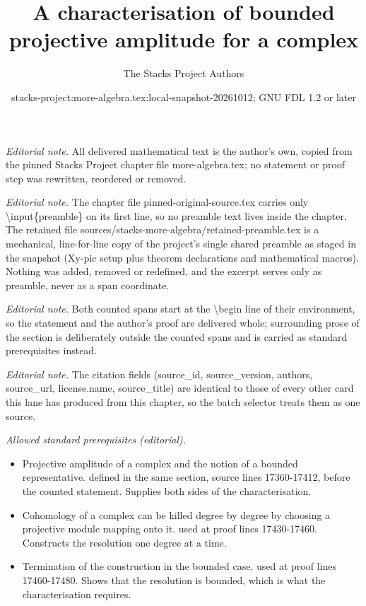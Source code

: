 \documentclass[10pt,a4paper]{amsart}
\title{A characterisation of bounded projective amplitude for a complex}
\author{The Stacks Project Authors}
\date{stacks-project:more-algebra.tex:local-snapshot-20261012; GNU FDL 1.2 or later}
\theoremstyle{plain}
\theoremstyle{definition}
\theoremstyle{remark}
\numberwithin{equation}{subsection}
\begin{document}
\maketitle
\setcounter{subsection}{1}
\noindent\textit{Editorial note.} All delivered mathematical text is the author's own, copied from the pinned Stacks Project chapter file more-algebra.tex; no statement or proof step was rewritten, reordered or removed.\par\medskip
\noindent\textit{Editorial note.} The chapter file pinned-original-source.tex carries only \textbackslash{}input\{preamble\} on its first line, so no preamble text lives inside the chapter. The retained file sources/stacks-more-algebra/retained-preamble.tex is a mechanical, line-for-line copy of the project's single shared preamble as staged in the snapshot (Xy-pic setup plus theorem declarations and mathematical macros). Nothing was added, removed or redefined, and the excerpt serves only as preamble, never as a span coordinate.\par\medskip
\noindent\textit{Editorial note.} Both counted spans start at the \textbackslash{}begin line of their environment, so the statement and the author's proof are delivered whole; surrounding prose of the section is deliberately outside the counted spans and is carried as standard prerequisites instead.\par\medskip
\noindent\textit{Editorial note.} The citation fields (source\_id, source\_version, authors, source\_url, license.name, source\_title) are identical to those of every other card this lane has produced from this chapter, so the batch selector treats them as one source.\par\medskip
\noindent\textit{Allowed standard prerequisites (editorial).}\begin{itemize}
\item Projective amplitude of a complex and the notion of a bounded representative. defined in the same section, source lines 17360-17412, before the counted statement. Supplies both sides of the characterisation.
\item Cohomology of a complex can be killed degree by degree by choosing a projective module mapping onto it. used at proof lines 17430-17460. Constructs the resolution one degree at a time.
\item Termination of the construction in the bounded case. used at proof lines 17460-17480. Shows that the resolution is bounded, which is what the characterisation requires.
\end{itemize}\medskip
\end{document}
